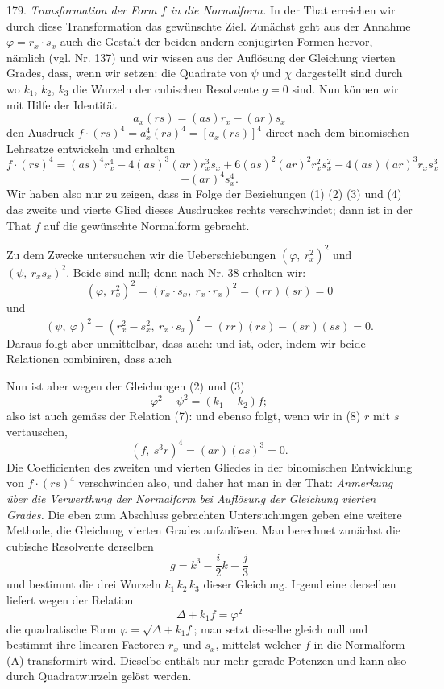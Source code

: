 179. \textit{Transformation der Form $f$ in die Normalform.} In der That erreichen wir durch diese Transformation das gewünschte Ziel. Zunächst geht aus der Annahme $\varphi=r_x\cdot s_x$ auch die Gestalt der beiden andern conjugirten Formen hervor, nämlich (vgl. Nr. 137)
und wir wissen aus der Auflösung der Gleichung vierten Grades, dass, wenn wir setzen:
die Quadrate von $\psi$ und $\chi$ dargestellt sind durch
wo $k_1$, $k_2$, $k_3$ die Wurzeln der cubischen Resolvente $g=0$ sind. Nun können wir mit Hilfe der Identität
\[
a_x(rs)=(as)r_x-(ar)s_x
\]
den Ausdruck $f\cdot(rs)^4=a_x^4(rs)^4=[a_x(rs)]^4$ direct nach dem binomischen Lehrsatze entwickeln und erhalten
\[
f\cdot(rs)^4=(as)^4r_x^4-4(as)^3(ar)r_x^3s_x+6(as)^2(ar)^2r_x^2s_x^2-4(as)(ar)^3r_xs_x^3
\]
\[
+(ar)^4s_x^4.
\]
Wir haben also nur zu zeigen, dass in Folge der Beziehungen (1) (2) (3) und (4) das zweite und vierte Glied dieses Ausdruckes rechts verschwindet; dann ist in der That $f$ auf die gewünschte Normalform gebracht.

Zu dem Zwecke untersuchen wir die Ueberschiebungen $(\varphi,\ r_x^2)^2$ und $(\psi,\ r_xs_x)^2$. Beide sind null; denn nach Nr. 38 erhalten wir:
\[
(\varphi,\ r_x^2)^2=(r_x\cdot s_x,\ r_x\cdot r_x)^2=(rr)(sr)=0
\]
und
\[
(\psi,\ \varphi)^2=(r_x^2-s_x^2,\ r_x\cdot s_x)^2=(rr)(rs)-(sr)(ss)=0.
\]
Daraus folgt aber unmittelbar, dass auch:
und
ist, oder, indem wir beide Relationen combiniren, dass auch


Nun ist aber wegen der Gleichungen (2) und (3)
\[
\varphi^2-\psi^2=(k_1-k_2)f;
\]
also ist auch gemäss der Relation (7):
und ebenso folgt, wenn wir in (8) $r$ mit $s$ vertauschen,
\[
(f,\ s^3r)^4=(ar)(as)^3=0.
\]
Die Coefficienten des zweiten und vierten Gliedes in der binomischen Entwicklung von $f\cdot(rs)^4$ verschwinden also, und daher hat man in der That:
\textit{Anmerkung über die Verwerthung der Normalform bei Auflösung der Gleichung vierten Grades.} Die eben zum Abschluss gebrachten Untersuchungen geben eine weitere Methode, die Gleichung vierten Grades aufzulösen. Man berechnet zunächst die cubische Resolvente derselben
\[
g=k^3-\frac{i}{2}k-\frac{j}{3}
\]
und bestimmt die drei Wurzeln $k_1\,k_2\,k_3$ dieser Gleichung. Irgend eine derselben liefert wegen der Relation
\[
\Delta+k_1f=\varphi^2
\]
die quadratische Form $\varphi=\sqrt{\Delta+k_1f}$; man setzt dieselbe gleich null und bestimmt ihre linearen Factoren $r_x$ und $s_x$, mittelst welcher $f$ in die Normalform (A) transformirt wird. Dieselbe enthält nur mehr gerade Potenzen und kann also durch Quadratwurzeln gelöst werden.

